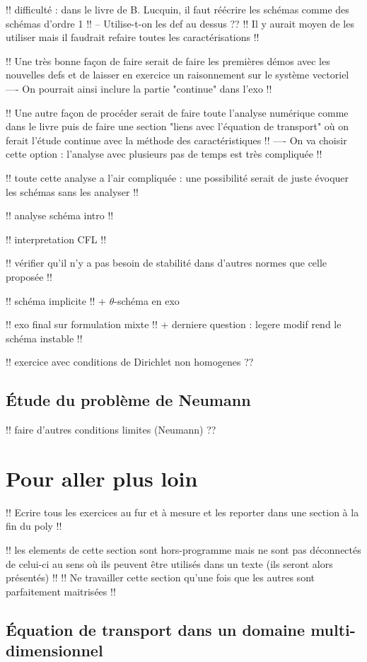 \documentclass[12pt,a4paper,twoside]{article}
\begin{document}
!! difficult\'e : dans le livre de B. Lucquin, il faut r\'e\'ecrire les 
sch\'emas comme des sch\'emas d'ordre 1 !!
-- Utilise-t-on les def au dessus ??
!! Il y aurait moyen de les utiliser mais il faudrait refaire toutes les 
caract\'erisations !!

!! Une tr\`es bonne fa\c{c}on de faire serait de faire les premi\`eres d\'emos avec
les nouvelles defs et de laisser en exercice un raisonnement sur le syst\`eme vectoriel
---- On pourrait ainsi inclure la partie "continue" dans l'exo !!


!! Une autre fa\c{c}on de proc\'eder serait de faire toute l'analyse num\'erique comme dans
le livre puis de faire une section "liens avec l'\'equation de transport"
o\`u on ferait l'\'etude continue avec la m\'ethode des caract\'eristiques !!
---- On va choisir cette option : l'analyse avec plusieurs pas de temps est tr\`es compliqu\'ee !!



!! toute cette analyse a l'air compliqu\'ee : une possibilit\'e serait 
de juste \'evoquer les sch\'emas sans les analyser !!

!! analyse sch\'ema intro !!

!! interpretation CFL !!

!! v\'erifier qu'il n'y a pas besoin de stabilit\'e dans d'autres normes
que celle propos\'ee !!


!! sch\'ema implicite !!
+ $\theta$-sch\'ema en exo


!! exo final sur formulation mixte !!
+ derniere question : legere modif rend le sch\'ema instable !!

!! exercice avec conditions de Dirichlet non homogenes ??

\subsection{\'Etude du probl\`eme de Neumann}


!! faire d'autres conditions limites (Neumann) ??

\section{Pour aller plus loin}

!! Ecrire tous les exercices au fur et \`a mesure et les reporter
dans une section \`a la fin du poly !!


!! les elements de cette section sont hors-programme mais ne sont pas 
d\'econnect\'es de celui-ci au sens o\`u ils peuvent \^etre utilis\'es 
dans un texte (ils seront alors pr\'esent\'es) !!
!! Ne travailler cette section qu'une fois que les autres sont parfaitement maitris\'ees !!

\subsection{\'Equation de transport dans un domaine multi-dimensionnel}
\label{subsec:transport_multiD}


\end{document}
